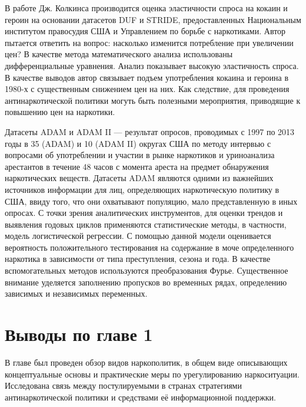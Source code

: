 В работе Дж. Колкинса \cite{Caulkins1995} производится оценка эластичности спроса 
на кокаин и героин на основании датасетов DUF и STRIDE, предоставленных
Национальным институтом правосудия США и Управлением по борьбе с наркотиками.
Автор пытается ответить на вопрос: насколько изменится потребление при
увеличении цен? В качестве метода математического анализа использованы
дифференциальные уравнения. Анализ показывает высокую эластичность спроса. В
качестве выводов автор связывает подъем употребления кокаина и героина в 1980-х
с существенным снижением цен на них. Как следствие, для проведения
антинаркотической политики могуть быть полезными мероприятия, приводящие к
повышению цен на наркотики.

Датасеты ADAM и ADAM II --- результат опросов, проводимых с 1997 по 2013 годы в
35 (ADAM) и 10 (ADAM II) округах США по методу интервью с вопросами об
употреблении и участии в рынке наркотиков и уриноанализа арестантов в течение 48
часов с момента ареста на предмет обнаружения наркотических
веществ\cite{Hunt2013, Chapman2010}. Датасеты ADAM являются одними из
важнейших источников информации для лиц, определяющих наркотическую политику в
США, ввиду того, что они охватывают популяцию, мало представленную в иных
опросах. С точки зрения аналитических инструментов, для оценки трендов и
выявления годовых циклов применяются статистические методы, в частности, модель
логистической регрессии.  С помощью данной модели оценивается вероятность
положительного тестирования на содержание в моче определенного наркотика в
зависимости от типа преступления, сезона и года. В качестве вспомогательных
методов используются преобразования Фурье. Существенное внимание уделяется
заполнению пропусков во временных рядах, определению зависимых и независимых
переменных.


\newpage
\section*{Выводы по главе 1}

В главе был проведен обзор видов наркополитик, в общем виде описывающих 
концептуальные основы и практические меры по урегулированию наркоситуации.  
Исследована связь между постулируемыми в странах стратегиями антинаркотической 
политики и средствами её информационной поддержки.

